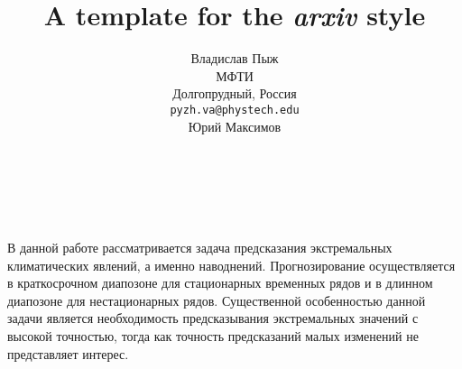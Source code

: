 \documentclass{article}
\title{A template for the \emph{arxiv} style}
\author{ Владислав Пыж	\\
	МФТИ\\
	Долгопрудный, Россия \\
	\texttt{pyzh.va@phystech.edu} \\
	\And
	Юрий Максимов\\
	\\
	\\
	\texttt{} \\
}
\date{}
\begin{document}
\maketitle

В данной работе рассматривается задача предсказания экстремальных климатических явлений, а именно наводнений. Прогнозирование осуществляется в краткосрочном диапозоне для стационарных временных рядов и в длинном диапозоне для нестационарных рядов. Существенной особенностью данной задачи является необходимость предсказывания экстремальных значений с высокой точностью, тогда как точность предсказаний малых изменений не представляет интерес.
\end{document}
